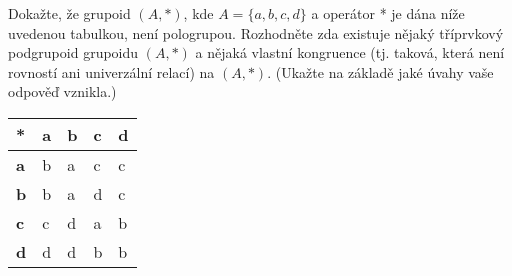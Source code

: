 \subsubsection{} 
Dokažte, že grupoid $(A, *)$, kde $A = \{a,b,c,d\}$ a
operátor * je dána níže uvedenou tabulkou, není pologrupou.
Rozhodněte zda existuje nějaký tříprvkový podgrupoid grupoidu $(A,
*)$ a nějaká vlastní kongruence (tj. taková, která není rovností ani
univerzální relací) na $(A, *)$. (Ukažte na základě jaké úvahy vaše
odpověď vznikla.)

\begin{table}[h]
\centering
\begin{tabular}{|l|l|l|l|l|}
\hline
*          & \textbf{a} & \textbf{b} & \textbf{c} & \textbf{d} \\ \hline
\textbf{a} & b          & a          & c          & c          \\ \hline
\textbf{b} & b          & a          & d          & c          \\ \hline
\textbf{c} & c          & d          & a          & b          \\ \hline
\textbf{d} & d          & d          & b          & b          \\ \hline
\end{tabular}
\end{table}
